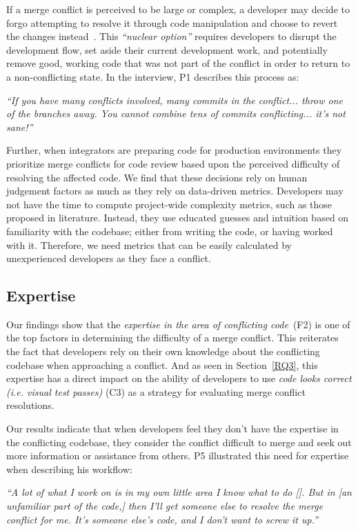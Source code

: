 If a merge conflict is perceived to be large or complex, a developer may decide to forgo attempting to resolve it through code manipulation and choose to revert the changes instead~\cite{Guzzi2015}.
This \emph{``nuclear option''} requires developers to disrupt the development flow, set aside their current development work, and potentially remove good, working code that was not part of the conflict in order to return to a non-conflicting state.
In the interview, P1 describes this process as:
\begin{quoting}
\textit{``If you have many conflicts involved, many commits in the conflict... throw one of the branches away. You cannot combine tens of commits conflicting... it's not sane!''}
\end{quoting}

Further, when integrators are preparing code for production environments they prioritize merge conflicts for code review based upon the perceived difficulty of resolving the affected code.
We find that these decisions rely on human judgement factors as much as they rely on data-driven metrics.
Developers may not have the time to compute project-wide complexity metrics, such as those proposed in literature.
Instead, they use educated guesses and intuition based on familiarity with the codebase; either from writing the code, or having worked with it.
Therefore, we need metrics that can be easily calculated by unexperienced developers as they face a conflict. 

\subsection{Expertise}\label{knowledge-based-factors}

Our findings show that the \textit{expertise in the area of conflicting code}~(F2) is one of the top factors in determining the difficulty of a merge conflict. 
This reiterates the fact that developers rely on their own knowledge about the conflicting codebase when approaching a conflict. 
And as seen in Section~\ref{RQ3}, this expertise has a direct impact on the ability of developers to use \textit{code looks correct (i.e. visual test passes)} (C3) as a strategy for evaluating merge conflict resolutions.

Our results indicate that when developers feel they don't have the expertise in the conflicting codebase, they consider the conflict difficult to merge and seek out more information or assistance from others.
P5 illustrated this need for expertise when describing his workflow: 
\begin{quoting}
	\textit{``A lot of what I work on is in my own little area \textellipsis I know what to do [\textellipsis]. But in [an unfamiliar part of the code,] then I'll get someone else to resolve the merge conflict for me. It's someone else's code, and I don't want to screw it up.''}
\end{quoting}

